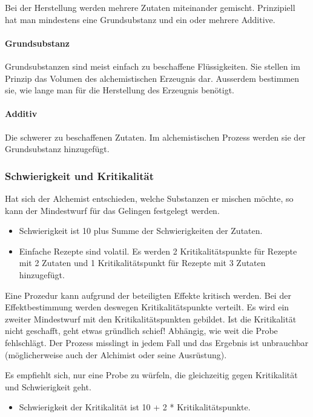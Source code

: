 \documentclass{article}
\begin{document}
Bei der Herstellung werden mehrere Zutaten miteinander gemischt. Prinzipiell hat man mindestens eine Grundsubstanz und
ein oder mehrere Additive.

\paragraph{Grundsubstanz}

Grundsubstanzen sind meist einfach zu beschaffene Flüssigkeiten. Sie stellen im Prinzip das Volumen des
alchemistischen Erzeugnis dar. Ausserdem bestimmen sie, wie lange man für die Herstellung des Erzeugnis benötigt.

\paragraph{Additiv}

Die schwerer zu beschaffenen Zutaten. Im alchemistischen Prozess werden sie der Grundsubstanz hinzugefügt.

\subsubsection{Schwierigkeit und Kritikalität}

Hat sich der Alchemist entschieden, welche Substanzen er mischen möchte, so kann der Mindestwurf für das Gelingen
festgelegt werden.

\begin{itemize}
\item Schwierigkeit ist 10 plus Summe der Schwierigkeiten der Zutaten.
\item Einfache Rezepte sind volatil. Es werden 2 Kritikalitätspunkte für Rezepte mit 2 Zutaten und 1 Kritikalitätspunkt für Rezepte mit 3 Zutaten hinzugefügt.
\end{itemize}

Eine Prozedur kann aufgrund der beteiligten Effekte kritisch werden. Bei der Effektbestimmung werden deswegen
Kritikalitätspunkte verteilt. Es wird ein zweiter Mindestwurf mit den Kritikalitätspunkten gebildet. Ist die
Kritikalität nicht geschafft, geht etwas gründlich schief! Abhängig, wie weit die Probe fehlschlägt. Der Prozess
misslingt in jedem Fall und das Ergebnis ist unbrauchbar (möglicherweise auch der Alchimist oder seine Ausrüstung).

Es empfiehlt sich, nur eine Probe zu würfeln, die gleichzeitig gegen Kritikalität und Schwierigkeit
geht.

\begin{itemize}
\item Schwierigkeit der Kritikalität ist 10 + 2 * Kritikalitätspunkte.
\end{itemize}
\end{document}
